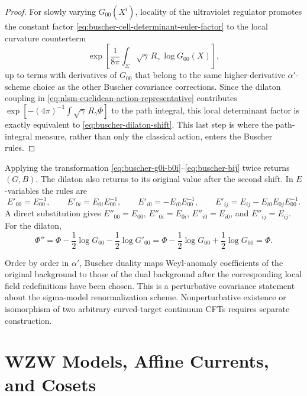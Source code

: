 \begin{proof}
For slowly varying \(G_{00}(X^i)\), locality of the ultraviolet regulator
promotes the constant factor
\eqref{eq:buscher-cell-determinant-euler-factor} to the local curvature
counterterm
\[
  \exp\!\left[
    \frac1{8\pi}
    \int_\Sigma\sqrt\gamma\,R_\gamma\,\log G_{00}(X)
  \right],
\]
up to terms with derivatives of \(G_{00}\) that belong to the same
higher-derivative \(\alpha'\)-scheme choice as the other Buscher covariance
corrections.  Since the dilaton coupling in
\eqref{eq:nlsm-euclidean-action-representative} contributes
\(\exp[-(4\pi)^{-1}\int\sqrt\gamma\,R_\gamma\Phi]\) to the path integral,
this local determinant factor is exactly equivalent to
\eqref{eq:buscher-dilaton-shift}.  This last step is where the
path-integral measure, rather than only the classical action, enters the
Buscher rules.
\end{proof}

\begin{remark}[Involutivity]
\label{rem:buscher-involutive}
Applying the transformation
\eqref{eq:buscher-g0i-b0i}--\eqref{eq:buscher-bij} twice returns
\((G,B)\).  The dilaton also returns to its original value after the second
shift.
In \(E\)-variables the rules are
\[
  E'_{00}=E_{00}^{-1},\qquad
  E'_{0i}=E_{0i}E_{00}^{-1},\qquad
  E'_{i0}=-E_{i0}E_{00}^{-1},
  \qquad
  E'_{ij}=E_{ij}-E_{i0}E_{0j}E_{00}^{-1}.
\]
A direct substitution gives \(E''_{00}=E_{00}\),
\(E''_{0i}=E_{0i}\), \(E''_{i0}=E_{i0}\), and
\(E''_{ij}=E_{ij}\).  For the dilaton,
\[
  \Phi''
  =
  \Phi-\frac12\log G_{00}
  -\frac12\log G'_{00}
  =
  \Phi-\frac12\log G_{00}
  +\frac12\log G_{00}
  =
  \Phi .
\]
\end{remark}

\begin{controlledapproximation}
\label{capprox:buscher-beta-covariance}
Order by order in \(\alpha'\), Buscher duality maps Weyl-anomaly
coefficients of the original background to those of the dual background
after the corresponding local field redefinitions have been chosen.  This is
a perturbative covariance statement about the sigma-model renormalization
scheme.  Nonperturbative existence or isomorphism of two arbitrary
curved-target continuum CFTs requires separate construction.
\end{controlledapproximation}

\section{WZW Models, Affine Currents, and Cosets}
\label{sec:wzw-affine-currents-cosets}

